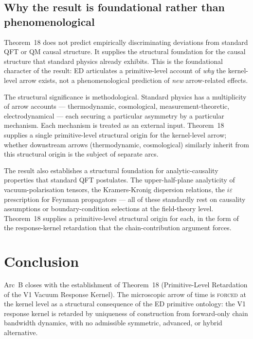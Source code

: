 \documentclass[11pt,a4paper]{article}
\begin{document}
\subsection{Why the result is foundational rather than phenomenological}

Theorem~18 does not predict empirically discriminating deviations from standard QFT or QM causal structure. It supplies the structural foundation for the causal structure that standard physics already exhibits. This is the foundational character of the result: ED articulates a primitive-level account of \emph{why} the kernel-level arrow exists, not a phenomenological prediction of \emph{new} arrow-related effects.

The structural significance is methodological. Standard physics has a multiplicity of arrow accounts --- thermodynamic, cosmological, measurement-theoretic, electrodynamical --- each securing a particular asymmetry by a particular mechanism. Each mechanism is treated as an external input. Theorem~18 supplies a single primitive-level structural origin for the kernel-level arrow; whether downstream arrows (thermodynamic, cosmological) similarly inherit from this structural origin is the subject of separate arcs.

The result also establishes a structural foundation for analytic-causality properties that standard QFT postulates. The upper-half-plane analyticity of vacuum-polarisation tensors, the Kramers-Kronig dispersion relations, the $i\varepsilon$ prescription for Feynman propagators --- all of these standardly rest on causality assumptions or boundary-condition selections at the field-theory level. Theorem~18 supplies a primitive-level structural origin for each, in the form of the response-kernel retardation that the chain-contribution argument forces.

\section{Conclusion}

Arc~B closes with the establishment of Theorem~18 (Primitive-Level Retardation of the V1 Vacuum Response Kernel). The microscopic arrow of time is \textsc{forced} at the kernel level as a structural consequence of the ED primitive ontology: the V1 response kernel is retarded by uniqueness of construction from forward-only chain bandwidth dynamics, with no admissible symmetric, advanced, or hybrid alternative.
\end{document}
